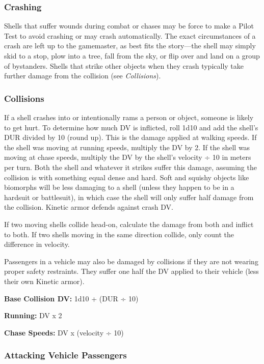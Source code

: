 \subsubsection{Crashing}

Shells that suffer wounds during combat or chases 
may be force to make a Pilot Test to avoid crashing 
or may crash automatically. The exact circumstances 
of a crash are left up to the gamemaster, as best fits 
the story—the shell may simply skid to a stop, plow 
into a tree, fall from the sky, or flip over and land on 
a group of bystanders. Shells that strike other objects 
when they crash typically take further damage from 
the collision (see \textit{Collisions}).

\subsubsection{Collisions}

If a shell crashes into or intentionally rams a person or 
object, someone is likely to get hurt. To determine how 
much DV is inflicted, roll 1d10 and add the shell's DUR 
divided by 10 (round up). This is the damage applied 
at walking speeds. If the shell was moving at running 
speeds, multiply the DV by 2. If the shell was moving 
at chase speeds, multiply the DV by the shell's velocity 
÷ 10 in meters per turn. Both the shell and whatever 
it strikes suffer this damage, assuming the collision is 
with something equal dense and hard. Soft and squishy 
objects like biomorphs will be less damaging to a shell 
(unless they happen to be in a hardsuit or battlesuit), in 
which case the shell will only suffer half damage from 
the collision. Kinetic armor defends against crash DV.

If two moving shells collide head-on, calculate the 
damage from both and inflict to both. If two shells 
moving in the same direction collide, only count the 
difference in velocity.

Passengers in a vehicle may also be damaged by collisions
if they are not wearing proper safety restraints.
They suffer one half the DV applied to their vehicle 
(less their own Kinetic armor).

\textbf{Base Collision DV:} 1d10 + (DUR ÷ 10)

\textbf{Running:} DV x 2

\textbf{Chase Speeds:} DV x (velocity ÷ 10)

\subsubsection{Attacking Vehicle Passengers}

